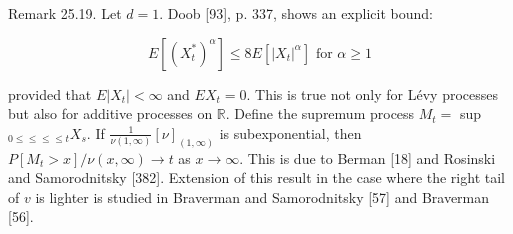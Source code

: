 \documentclass[a4paper,11pt]{article}
\begin{document}

Remark 25.19. Let $d=1$. Doob [93], p. 337, shows an explicit bound:

\begin{equation*}
    E\left[\left(X_{t}^{*}\right)^{\alpha}\right] \leq 8 E\left[\left|X_{t}\right|^{\alpha}\right] \text { for } \alpha \geq 1 \tag{25.16}
\end{equation*}


provided that $E\left|X_{t}\right|<\infty$ and $E X_{t}=0$. This is true not only for Lévy processes but also
for additive processes on $\mathbb{R}$. Define the supremum process $M_{t}=$ sup $_{0 \leq \leq \leq \leq t} X_{s}$.
If $\frac{1}{\nu(1, \infty)}[\nu]_{(1, \infty)}$ is subexponential,
then $P\left[M_{t}>x\right] / \nu(x, \infty) \rightarrow t$ as $x \rightarrow \infty$.
This is due to Berman [18] and Rosinski and Samorodnitsky [382]. Extension of this result in the case
where the right tail of $v$ is lighter is studied in Braverman and Samorodnitsky [57] and Braverman [56].
\end{document}

